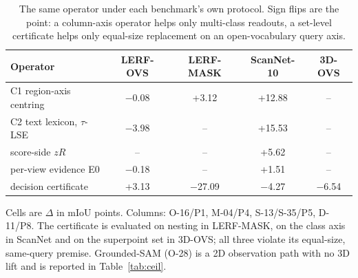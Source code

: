 \begin{table}[t]
\centering
\small
\caption{The same operator under each benchmark's own protocol. Sign flips are the point: a column-axis operator helps only multi-class readouts, a set-level certificate helps only equal-size replacement on an open-vocabulary query axis.}
\label{tab:transfer}
\begin{tabular}{lcccc}
\toprule
Operator & LERF-OVS & LERF-MASK & ScanNet-10 & 3D-OVS \\
\midrule
C1 region-axis centring & $-$0.08 & +3.12 & +12.88 & -- \\
C2 text lexicon, $\tau$-LSE & $-$3.98 & -- & +15.53 & -- \\
score-side $zR$ & -- & -- & +5.62 & -- \\
per-view evidence E0 & $-$0.18 & -- & +1.51 & -- \\
decision certificate & +3.13 & $-$27.09 & $-$4.27 & $-$6.54 \\
\bottomrule
\end{tabular}
\par\smallskip\footnotesize Cells are $\Delta$ in mIoU points. Columns: O-16/P1, M-04/P4, S-13/S-35/P5, D-11/P8. The certificate is evaluated on nesting in LERF-MASK, on the class axis in ScanNet and on the superpoint set in 3D-OVS; all three violate its equal-size, same-query premise. Grounded-SAM (O-28) is a 2D observation path with no 3D lift and is reported in Table~\ref{tab:ceil}.
\end{table}
